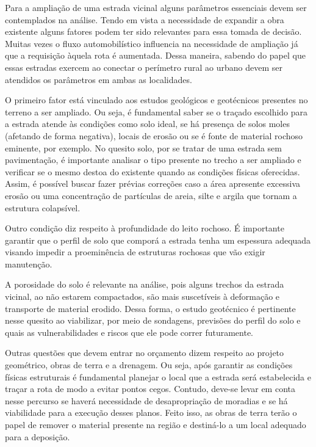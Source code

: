 
Para a ampliação de uma estrada vicinal alguns parâmetros essenciais devem ser contemplados na análise. Tendo em vista a necessidade de expandir a obra existente alguns fatores podem ter sido relevantes para essa tomada de decisão. Muitas vezes o fluxo automobilístico influencia na necessidade de ampliação já que a requisição àquela rota é aumentada. Dessa maneira, sabendo do papel que essas estradas exercem ao conectar o perímetro rural ao urbano devem ser atendidos os parâmetros em ambas as localidades.

O primeiro fator está vinculado aos estudos geológicos e geotécnicos presentes no terreno a ser ampliado. Ou seja, é fundamental saber se o traçado escolhido para a estrada atende às condições como solo ideal, se há presença de solos moles (afetando de forma negativa), locais de erosão ou se é fonte de material rochoso eminente, por exemplo. No quesito solo, por se tratar de uma estrada sem pavimentação, é importante analisar o tipo presente no trecho a ser ampliado e verificar se o mesmo destoa do existente quando as condições físicas oferecidas. Assim, é possível buscar fazer  prévias correções caso a área apresente excessiva erosão ou uma concentração de partículas de areia, silte e argila que tornam a estrutura colapsível.

Outro condição diz respeito à profundidade do leito rochoso. É importante garantir que o perfil de solo que comporá a estrada tenha um espessura adequada visando impedir a proeminência de estruturas rochosas que vão exigir manutenção. 

A porosidade do solo é relevante na análise, pois alguns trechos da estrada vicinal, ao não estarem compactados, são mais suscetíveis à deformação e transporte de material erodido. Dessa forma, o estudo geotécnico é pertinente nesse quesito ao viabilizar, por meio de sondagens, previsões do perfil do solo e quais as vulnerabilidades e riscos que ele pode correr futuramente.

Outras questões que devem entrar no orçamento dizem respeito ao projeto geométrico, obras de terra e a drenagem. Ou seja, após garantir as condições físicas estruturais é fundamental planejar o local que a estrada será estabelecida e traçar a rota de modo a evitar pontos cegos. Contudo, deve-se levar em conta nesse percurso se haverá necessidade de desapropriação de moradias e se há viabilidade para a execução desses planos. Feito isso, as obras de terra terão o papel de remover o material presente na região e destiná-lo a um local adequado para a deposição. 

